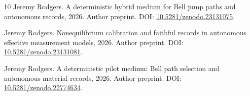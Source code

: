 \documentclass[11pt]{article}
\theoremstyle{definition}\newtheorem{assumption}[theorem]{Constitutive assumption}
\theoremstyle{remark}\newtheorem{remark}[theorem]{Remark}
\begin{document}
\begin{thebibliography}{10}
Jeremy Rodgers.
\newblock A deterministic hybrid medium for {Bell} jump paths and autonomous
  records, 2026.
\newblock Author preprint. DOI: \href{https://doi.org/10.5281/zenodo.23131075}{10.5281/zenodo.23131075}.

Jeremy Rodgers.
\newblock Nonequilibrium calibration and faithful records in autonomous
  effective measurement models, 2026.
\newblock Author preprint. DOI: \href{https://doi.org/10.5281/zenodo.23131081}{10.5281/zenodo.23131081}.

Jeremy Rodgers.
\newblock A deterministic pilot medium: Bell path selection and autonomous
  material records, 2026.
\newblock Author preprint. DOI: \href{https://doi.org/10.5281/zenodo.22774634}{10.5281/zenodo.22774634}.

\end{thebibliography}
\end{document}
